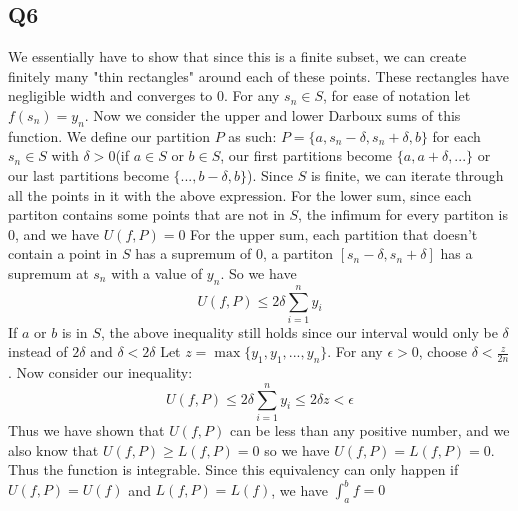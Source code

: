 \documentclass[12pt]{article}
\begin{document}
\subsection{Q6}
We essentially have to show that since this is a finite subset, we can create finitely many "thin rectangles" around each of these points. These rectangles have negligible width and converges to 0.
\newline
For any $s_n \in S$, for ease of notation let $f(s_n) = y_n$. Now we consider the upper and lower Darboux sums of this function.
\newline
We define our partition $P$ as such: $P = \{a, s_n-\delta, s_n+\delta, b \}$ for each $s_n \in S$ with $\delta>0$(if $a \in S$ or $b \in S$,
our first partitions become $\{a, a+\delta, ...\}$ or our last partitions become $\{..., b-\delta, b\}$).
Since $S$ is finite, we can iterate through all the points in it with the above expression.
\newline
For the lower sum, since each partiton contains some points that are not in $S$, the infimum for every partiton is $0$, and we have $U(f,P) = 0$
\newline
For the upper sum, each partition that doesn't contain a point in $S$ has a supremum of $0$, a partiton $[s_n-\delta, s_n+\delta]$ has a supremum at $s_n$ with a value of $y_n$. So we have
$$U(f,P) \leq 2\delta \sum_{i=1}^n y_i$$
If $a$ or $b$ is in $S$, the above inequality still holds since our interval would only be $\delta$ instead of $2\delta$ and $\delta < 2\delta$
\newline
Let $z = \max \{y_1, y_1, ..., y_n\}$. For any $\epsilon >0$, choose $\delta < \frac{z}{2n}$. Now consider our inequality:
$$U(f,P) \leq 2\delta \sum_{i=1}^n y_i \leq 2\delta z < \epsilon$$
Thus we have shown that $U(f,P)$ can be less than any positive number, and we also know that $U(f,P) \geq L(f,P)=0$ so we have $U(f,P)=L(f,P)=0$. Thus the function is integrable.
\newline
Since this equivalency can only happen if $U(f,P)=U(f)$ and $L(f,P)=L(f)$, we have $\int_a ^b f = 0$
\newpage
\end{document}
